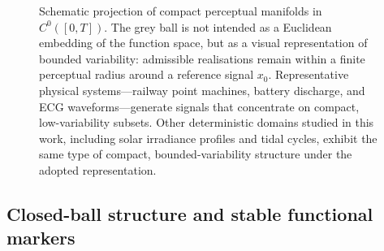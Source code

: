 \documentclass[10pt]{article}
\theoremstyle{plain}
\theoremstyle{definition}
\theoremstyle{remark}
\begin{document}
\begin{figure}[!htbp]

\caption{\small
Schematic projection of compact perceptual manifolds in $C^0([0,T])$.
The grey ball is not intended as a Euclidean embedding of the function space,
but as a visual representation of bounded variability: admissible realisations
remain within a finite perceptual radius around a reference signal $x_0$.
Representative physical systems---railway point machines, battery discharge,
and ECG waveforms---generate signals that concentrate on compact,
low-variability subsets. Other deterministic domains studied in this work,
including solar irradiance profiles and tidal cycles, exhibit the same type of
compact, bounded-variability structure under the adopted representation.
}
\label{fig:perceptual_manifold}
\end{figure}

\subsection{Closed-ball structure and stable functional markers}
\end{document}
